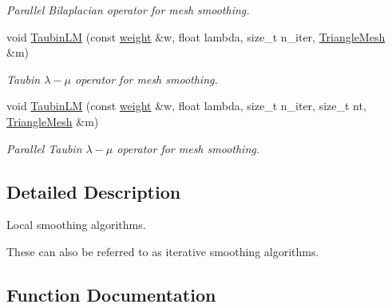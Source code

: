\begin{DoxyCompactItemize}
\begin{DoxyCompactList}\small\item\em Parallel Bilaplacian operator for mesh smoothing. \end{DoxyCompactList}\item 
void \hyperlink{namespacegeoproc_1_1smoothing_1_1local_a17dcfcb442ae9cfbad9964b789b8c7a6}{Taubin\+LM} (const \hyperlink{namespacegeoproc_a12e5a10581b53b9dd9a509127527f843}{weight} \&w, float lambda, size\+\_\+t n\+\_\+iter, \hyperlink{classgeoproc_1_1TriangleMesh}{Triangle\+Mesh} \&m)
\begin{DoxyCompactList}\small\item\em Taubin $\lambda-\mu$ operator for mesh smoothing. \end{DoxyCompactList}\item 
void \hyperlink{namespacegeoproc_1_1smoothing_1_1local_abea3fa692927cd47d165322f9791ddca}{Taubin\+LM} (const \hyperlink{namespacegeoproc_a12e5a10581b53b9dd9a509127527f843}{weight} \&w, float lambda, size\+\_\+t n\+\_\+iter, size\+\_\+t nt, \hyperlink{classgeoproc_1_1TriangleMesh}{Triangle\+Mesh} \&m)
\begin{DoxyCompactList}\small\item\em Parallel Taubin $\lambda-\mu$ operator for mesh smoothing. \end{DoxyCompactList}\end{DoxyCompactItemize}


\subsection{Detailed Description}
Local smoothing algorithms. 

These can also be referred to as iterative smoothing algorithms. 

\subsection{Function Documentation}
\mbox{\label{namespacegeoproc_1_1smoothing_1_1local_a5e2f0a2048d6fc14c372ea75bf70982f}} 

